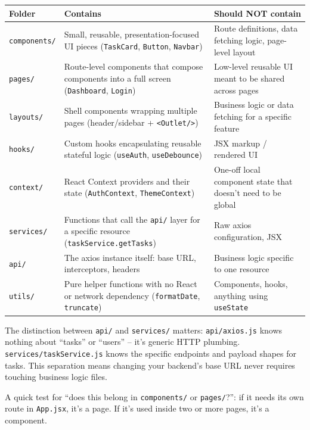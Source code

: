 \begin{table}[h]
\centering
\begin{tabularx}{\textwidth}{lXX}
\toprule
\textbf{Folder} & \textbf{Contains} & \textbf{Should NOT contain} \\
\midrule
\texttt{components/} & Small, reusable, presentation-focused UI pieces (\texttt{TaskCard}, \texttt{Button}, \texttt{Navbar}) & Route definitions, data fetching logic, page-level layout \\
\texttt{pages/} & Route-level components that compose components into a full screen (\texttt{Dashboard}, \texttt{Login}) & Low-level reusable UI meant to be shared across pages \\
\texttt{layouts/} & Shell components wrapping multiple pages (header/sidebar + \texttt{<Outlet/>}) & Business logic or data fetching for a specific feature \\
\texttt{hooks/} & Custom hooks encapsulating reusable stateful logic (\texttt{useAuth}, \texttt{useDebounce}) & JSX markup / rendered UI \\
\texttt{context/} & React Context providers and their state (\texttt{AuthContext}, \texttt{ThemeContext}) & One-off local component state that doesn't need to be global \\
\texttt{services/} & Functions that call the \texttt{api/} layer for a specific resource (\texttt{taskService.getTasks}) & Raw axios configuration, JSX \\
\texttt{api/} & The axios instance itself: base URL, interceptors, headers & Business logic specific to one resource \\
\texttt{utils/} & Pure helper functions with no React or network dependency (\texttt{formatDate}, \texttt{truncate}) & Components, hooks, anything using \texttt{useState} \\
\bottomrule
\end{tabularx}
\end{table}

\begin{notebox}[NOTE]
The distinction between \texttt{api/} and \texttt{services/} matters: \texttt{api/axios.js}
knows nothing about ``tasks'' or ``users'' -- it's generic HTTP plumbing.
\texttt{services/taskService.js} knows the specific endpoints and payload
shapes for tasks. This separation means changing your backend's base URL
never requires touching business logic files.
\end{notebox}

\begin{tipbox}[TIP]
A quick test for ``does this belong in \texttt{components/} or \texttt{pages/}?'':
if it needs its own route in \texttt{App.jsx}, it's a page. If it's used inside
two or more pages, it's a component.
\end{tipbox}
